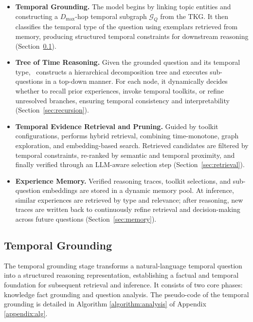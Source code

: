 \begin{itemize}[leftmargin=*]
  \item \textbf{Temporal Grounding.} 
  The model begins by linking topic entities and constructing a $D_{\max}$-hop temporal subgraph $\mathcal{G}_Q$ from the TKG. 
  It then classifies the temporal type of the question using exemplars retrieved from memory, producing structured temporal constraints for downstream reasoning (Section~\ref{sec:method:grounding}).

  \item \textbf{Tree of Time Reasoning.} 
  Given the grounded question and its temporal type, \mot\ constructs a hierarchical decomposition tree and executes sub-questions in a top-down manner. 
  For each node, it dynamically decides whether to recall prior experiences, invoke temporal toolkits, or refine unresolved branches, ensuring temporal consistency and interpretability (Section~\ref{sec:recursion}).

  \item \textbf{Temporal Evidence Retrieval and Pruning.} 
  Guided by toolkit configurations, \mot performs hybrid retrieval, combining time-monotone, graph exploration, and embedding-based search. 
  Retrieved candidates are filtered by temporal constraints, re-ranked by semantic and temporal proximity, and finally verified through an LLM-aware selection step (Section~\ref{sec:retrieval}).

  \item \textbf{Experience Memory.} 
  Verified reasoning traces, toolkit selections, and sub-question embeddings are stored in a dynamic memory pool. 
  At inference, similar experiences are retrieved by type and relevance; after reasoning, new traces are written back to continuously refine retrieval and decision-making across future questions (Section~\ref{sec:memory}).
\end{itemize}
\vspace{-4mm}
\subsection{Temporal Grounding}
\label{sec:method:grounding}

The temporal grounding stage transforms a natural-language temporal question into a structured reasoning representation, establishing a factual and temporal foundation for subsequent retrieval and inference.  
It consists of two core phases: knowledge fact grounding and question analysis.  The pseudo-code of the temporal grounding is detailed in Algorithm \ref{algorithm:analysis} of Appendix \ref{appendix:alg}.

